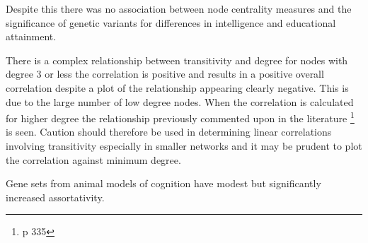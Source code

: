 Despite this there was no association between node centrality measures and the significance of genetic variants for differences in intelligence and educational attainment.

There is a complex relationship between transitivity and degree for nodes with degree 3 or less the correlation is positive and results in a positive overall correlation despite a plot of the relationship appearing clearly negative. This is due to the large number of low degree nodes. When the correlation is calculated for higher degree the relationship previously commented upon in the literature \cite{newman2018networks}\footnote{p 335} is seen. Caution should therefore be used in determining linear correlations involving transitivity especially in smaller networks and it may be prudent to plot the correlation against minimum degree.

Gene sets from animal models of cognition have modest but significantly increased assortativity. 





 


